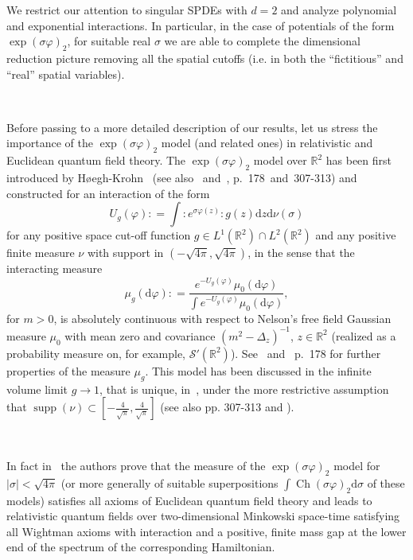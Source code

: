 \documentclass[a4paper,10pt]{article}
\newcommand{\mathd}{\mathrm{d}}
\newcommand{\tmop}[1]{\ensuremath{\operatorname{#1}}}
\begin{document}
We restrict our attention to singular SPDEs with $d = 2$ and analyze
polynomial and exponential interactions. In particular, in the case of
potentials of the form $\exp (\sigma \varphi)_2$, for suitable real $\sigma$
we are able to complete the dimensional reduction picture removing all the
spatial cutoffs (i.e. in both the ``fictitious'' and ``real'' spatial
variables).

\

Before passing to a more detailed description of our results, let us stress
the importance of the $\exp (\sigma \varphi)_2$ model (and related ones) in
relativistic and Euclidean quantum field theory. The $\exp (\sigma \varphi)_2$
model over $\mathbb{R}^2$ has been first introduced by
H{\o}egh-Krohn~{\cite{Krohn1971}} (see also~{\cite{Krohn1974}}
and~{\cite{Simon1974}}, p.~178~and~307-313) and constructed for an interaction
of the form
\[ U_g (\varphi) : = \int : e^{\sigma \varphi (z)} : g (z) \mathd z \mathd \nu
   (\sigma) \]
for any positive space cut-off function $g \in L^1 (\mathbb{R}^2) \cap L^2
(\mathbb{R}^2)$ and any positive finite measure $\nu$ with support in $(-
\sqrt{4 \pi}, \sqrt{4 \pi})$, in the sense that the interacting measure
\[ \mu_g (\mathd \varphi) : = \frac{e^{- U_g (\varphi)} \mu_0 (\mathd
   \varphi)}{\int e^{- U_g (\varphi)} \mu_0 (\mathd \varphi)}, \]
for $m > 0$, is absolutely continuous with respect to Nelson's free field
Gaussian measure $\mu_0$ with mean zero and covariance $(m^2 - \Delta_z)^{-
1}$, $z \in \mathbb{R}^2$ (realized as a probability measure on, for example,
$\mathcal{S}' (\mathbb{R}^2)$). See~{\cite{Krohn1974,Krohn1971}}
and~{\cite{Simon1974}} p.~178 for further properties of the measure $\mu_g$.
This model has been discussed in the infinite volume limit $g \rightarrow 1$,
that is unique, in~{\cite{Krohn1974}}, under the more
restrictive assumption that $\tmop{supp} (\nu) \subset \left[ -
\frac{4}{\sqrt{\pi}}, \frac{4}{\sqrt{\pi}} \right]$ (see also \cite{Simon1974} pp. 307-313 and \cite{FroPa}).

\

In fact in~{\cite{Krohn1974}} the authors prove that the measure of the $\exp
(\sigma \varphi)_2$ model for $| \sigma | < \sqrt{4 \pi}$ (or more generally
of suitable superpositions $\int \tmop{Ch} (\sigma \varphi)_2 \mathd \sigma$
of these models) satisfies all axioms of Euclidean quantum field theory and
leads to relativistic quantum fields over two-dimensional Minkowski space-time
satisfying all Wightman axioms with interaction and a positive, finite mass
gap at the lower end of the spectrum of the corresponding Hamiltonian.
\end{document}
